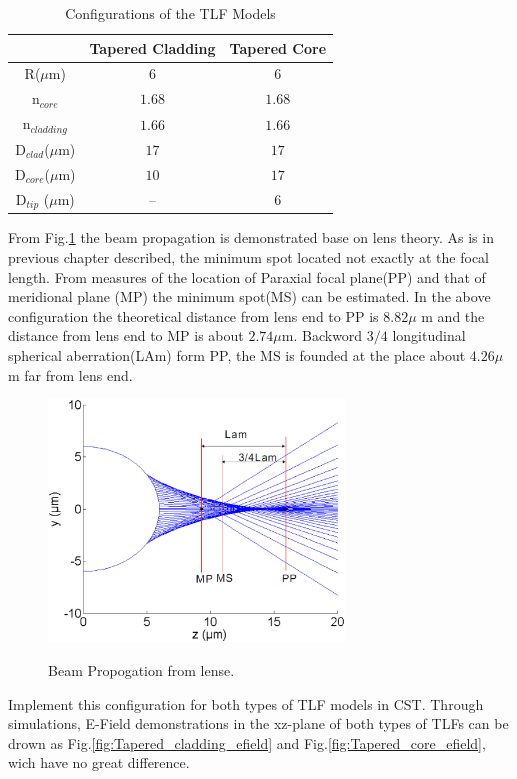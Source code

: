\begin{table}
\caption{Configurations of the TLF Models}
\centering
\begin{tabular}{ccc}
\hline
							&Tapered Cladding&Tapered Core\\
\hline
R($\mu$m) & $6$						 &$6$	\\
n$_{core}$&$1.68$&$1.68$\\
n$_{cladding}$&$1.66$&$1.66$\\
D$_{clad}$($\mu$m) &	$17$ &	$17$\\
D$_{core}$($\mu$m) & $10$ &	$17$\\
D$_{tip}$ ($\mu$m) & --   &	$6$\\
\hline
\end{tabular}
\label{tab:model_fiber_configuration}
\end{table}
From Fig.\quad\ref{fig:lens_spot} the beam propagation is demonstrated base on lens theory. As is in previous chapter described, the minimum spot located not exactly at the focal length. From measures of the location of Paraxial focal plane(PP) and that of meridional plane (MP) the minimum spot(MS) can be estimated. In the above configuration the theoretical distance from lens end to PP is $8.82 \mu$ m and the distance from lens end to MP is about $2.74 \mu$m. Backword $3/4$ longitudinal spherical aberration(LAm) form PP, the MS is founded at the place about $4.26 \mu$m far from lens end. 
\begin{figure}
\centering
	\includegraphics[width=0.7\textwidth]{bilder/cal_min_spot}
\label{fig:lens_spot}
\caption{Beam Propogation from lense.}
\end{figure}
Implement this configuration for both types of TLF models in CST. Through simulations, E-Field demonstrations in the xz-plane of both types of TLFs can be drown as Fig.\quad\ref{fig:Tapered_cladding_efield} and  Fig.\quad\ref{fig:Tapered_core_efield}, wich have no great difference.
